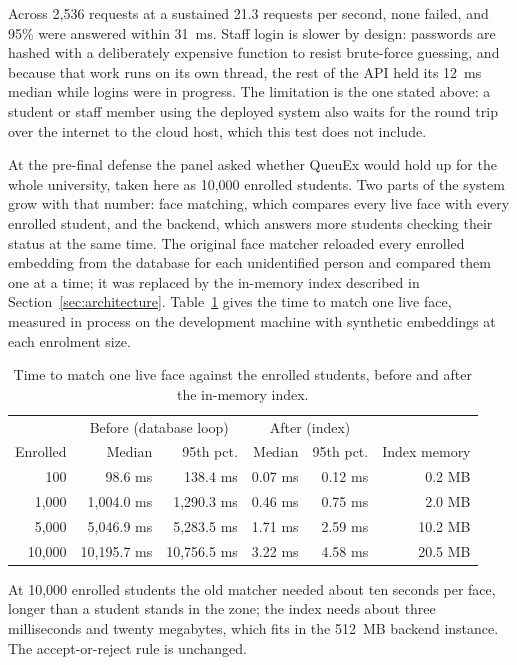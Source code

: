 \documentclass{research}
\newcommand{\sysname}{QueuEx}
\begin{document}
\noindent Across 2,536 requests at a sustained 21.3 requests per second,
none failed, and 95\% were answered within 31~ms. Staff login is slower
by design: passwords are hashed with a deliberately expensive function to
resist brute-force guessing, and because that work runs on its own
thread, the rest of the API held its 12~ms median while logins were in
progress. The limitation is the one stated above: a student or staff
member using the deployed system also waits for the round trip over the
internet to the cloud host, which this test does not include.

At the pre-final defense the panel asked whether \sysname{} would hold up for the whole university,
taken here as 10,000 enrolled students. Two parts of the system grow
with that number: face matching, which compares every live face with
every enrolled student, and the backend, which answers more students
checking their status at the same time. The original face matcher
reloaded every enrolled embedding from the database for each unidentified
person and compared them one at a time; it was replaced by the in-memory
index described in Section~\ref{sec:architecture}. Table~\ref{tab:face-scale}
gives the time to match one live face, measured in process on the
development machine with synthetic embeddings at each enrolment size.

\begin{table}[H]
\centering
\caption{Time to match one live face against the enrolled students,
before and after the in-memory index.}
\label{tab:face-scale}
\begin{tabular}{rrrrrr}
\hline
 & \multicolumn{2}{c}{Before (database loop)} & \multicolumn{2}{c}{After (index)} & \\
Enrolled & Median & 95th pct. & Median & 95th pct. & Index memory \\
\hline
100    & 98.6 ms     & 138.4 ms    & 0.07 ms & 0.12 ms & 0.2 MB \\
1,000  & 1,004.0 ms  & 1,290.3 ms  & 0.46 ms & 0.75 ms & 2.0 MB \\
5,000  & 5,046.9 ms  & 5,283.5 ms  & 1.71 ms & 2.59 ms & 10.2 MB \\
10,000 & 10,195.7 ms & 10,756.5 ms & 3.22 ms & 4.58 ms & 20.5 MB \\
\hline
\end{tabular}
\end{table}

\noindent At 10,000 enrolled students the old matcher needed about ten
seconds per face, longer than a student stands in the zone; the index
needs about three milliseconds and twenty megabytes, which fits in the
512~MB backend instance. The accept-or-reject rule is unchanged.
\end{document}
